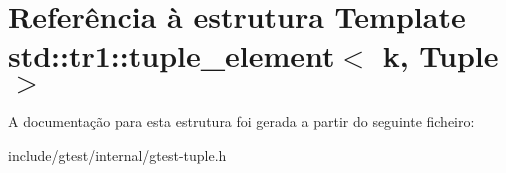\hypertarget{structstd_1_1tr1_1_1tuple__element}{\section{Referência à estrutura Template std\-:\-:tr1\-:\-:tuple\-\_\-element$<$ k, Tuple $>$}
\label{structstd_1_1tr1_1_1tuple__element}
}


A documentação para esta estrutura foi gerada a partir do seguinte ficheiro\-:\begin{DoxyCompactItemize}
\item 
include/gtest/internal/gtest-\/tuple.\-h\end{DoxyCompactItemize}
